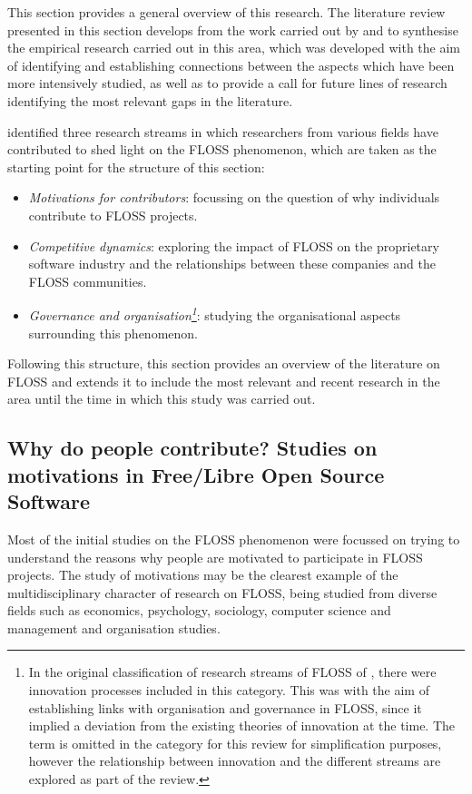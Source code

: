 This section provides a general overview of this research. The literature review presented in this section develops from the work carried out by \textcite{VonKrogh2006} and \textcite{crowston2012free} to synthesise the empirical research carried out in this area, which was developed with the aim of identifying and establishing connections between the aspects which have been more intensively studied, as well as to provide a call for future lines of research identifying the most relevant gaps in the literature.

\textcite{VonKrogh2006} identified three research streams in which researchers from various fields have contributed to shed light on the FLOSS phenomenon, which are taken as the starting point for the structure of this section:

\begin{itemize}
	\item \textit{Motivations for contributors}: focussing on the question of why individuals contribute to FLOSS projects.
	\item \textit{Competitive dynamics}: exploring the impact of FLOSS on the proprietary software industry and the relationships between these companies and the FLOSS communities.
	\item\textit{Governance and organisation\footnote{In the original classification of research streams of FLOSS of \textcite{VonKrogh2006}, there were innovation processes included in this category. This was with the aim of establishing links with organisation and governance in FLOSS, since it implied a deviation from the existing theories of innovation at the time. The term is omitted in the category for this review for simplification purposes, however the relationship between innovation and the different streams are explored as part of the review.}}: studying the organisational aspects surrounding this phenomenon.
\end{itemize}

Following this structure, this section provides an overview of the literature on FLOSS and extends it to include the most relevant and recent research in the area until the time in which this study was carried out.

\subsection{Why do people contribute? Studies on motivations in Free\slash Libre Open Source Software}

Most of the initial studies on the FLOSS phenomenon were focussed on trying to understand the reasons why people are motivated to participate in FLOSS projects. The study of motivations may be the clearest example of the multidisciplinary character of research on FLOSS, being studied from diverse fields such as economics, psychology, sociology, computer science and management and organisation studies.

